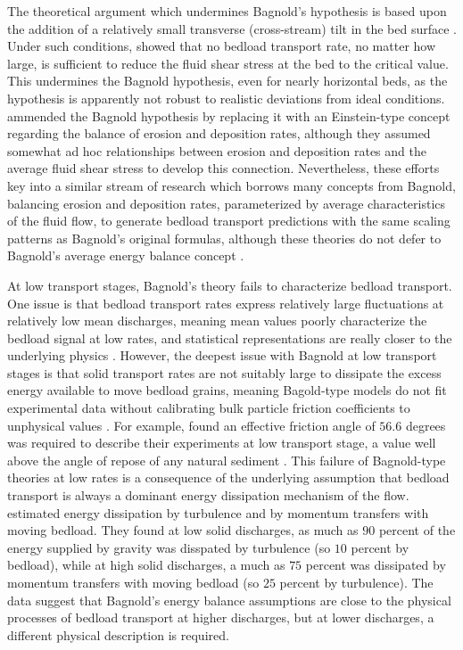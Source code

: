 \documentclass{article}
\begin{document}
The theoretical argument which undermines Bagnold's hypothesis is based upon the addition of a relatively small transverse (cross-stream) tilt in the bed surface \citep{Seminara2002}. 
Under such conditions, \citet{Seminara2002} showed that no bedload transport rate, no matter how large, is sufficient to reduce the fluid shear stress at the bed to the critical value.
This undermines the Bagnold hypothesis, even for nearly horizontal beds, as the hypothesis is apparently not robust to realistic deviations from ideal conditions. 
\citet{Parker2003} ammended the Bagnold hypothesis by replacing it with an Einstein-type concept regarding the balance of erosion and deposition rates, although they assumed somewhat ad hoc relationships between erosion and deposition rates and the average fluid shear stress to develop this connection. 
Nevertheless, these efforts key into a similar stream of research which borrows many concepts from Bagnold, balancing erosion and deposition rates, parameterized by average characteristics of the fluid flow, to generate bedload transport predictions with the same scaling patterns as Bagnold's original formulas, although these theories do not defer to Bagnold's average energy balance concept \citep{Charru2004, Charru2006, Lajenesse2010, Lajenesse2018}. 

At low transport stages, Bagnold's theory fails to characterize bedload transport.
One issue is that bedload transport rates express relatively large fluctuations at relatively low mean discharges, meaning mean values poorly characterize the bedload signal at low rates, and statistical representations are really closer to the underlying physics \citep{Ancey2008}.
However, the deepest issue with Bagnold at low transport stages is that solid transport rates are not suitably large to dissipate the excess energy available to move bedload grains, meaning Bagold-type models do not fit experimental data without calibrating bulk particle friction coefficients to unphysical values \citep{Engelund1976, Luque1976, Nelson1995, Nino1998}.
For example, \citet{Nino1998} found an effective friction angle of $56.6$ degrees was required to describe their experiments at low transport stage, a value well above the angle of repose of any natural sediment \citep{Miller1966}.
This failure of Bagnold-type theories at low rates is a consequence of the underlying assumption that bedload transport is always a dominant energy dissipation mechanism of the flow. 
\citet{Ancey2008} estimated energy dissipation by turbulence and by momentum transfers with moving bedload.
They found at low solid discharges, as much as $90$ percent of the energy supplied by gravity was disspated by turbulence (so $10$ percent by bedload), while at high solid discharges, a much as $75$ percent was dissipated by momentum transfers with moving bedload (so $25$ percent by turbulence). 
The data suggest that Bagnold's energy balance assumptions are close to the physical processes of bedload transport at higher discharges, but at lower discharges, a different physical description is required. 
\end{document}
